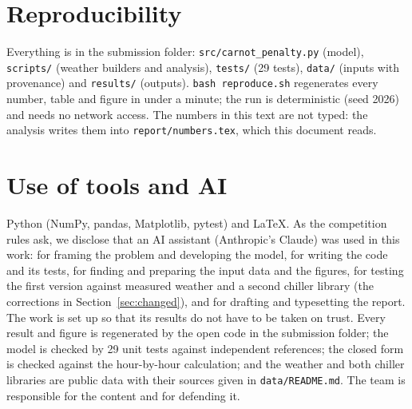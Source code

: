 \documentclass[10pt,a4paper]{article}
\begin{document}
\section*{Reproducibility}
Everything is in the submission folder: \texttt{src/carnot\_penalty.py} (model), \texttt{scripts/} (weather builders
and analysis), \texttt{tests/} (29 tests), \texttt{data/} (inputs with provenance) and \texttt{results/} (outputs).
\texttt{bash reproduce.sh} regenerates every number, table and figure in under a minute; the run is deterministic
(seed 2026) and needs no network access. The numbers in this text are not typed: the analysis writes them into
\texttt{report/numbers.tex}, which this document reads.

\section*{Use of tools and AI}
Python (NumPy, pandas, Matplotlib, pytest) and \LaTeX. As the competition rules ask, we disclose that an AI assistant
(Anthropic's Claude) was used in this work: for framing the problem and developing the model, for writing the code and
its tests, for finding and preparing the input data and the figures, for testing the first version against measured
weather and a second chiller library (the corrections in Section~\ref{sec:changed}), and for drafting and typesetting
the report.
The work is set up so that its results do not have to be taken on trust. Every result and figure is regenerated by
the open code in the submission folder; the model is checked by 29 unit tests against independent references; the
closed form is checked against the hour-by-hour calculation; and the weather and both chiller libraries are public
data with their sources given in \texttt{data/README.md}. The team is responsible for the content and for defending
it.
\end{document}
